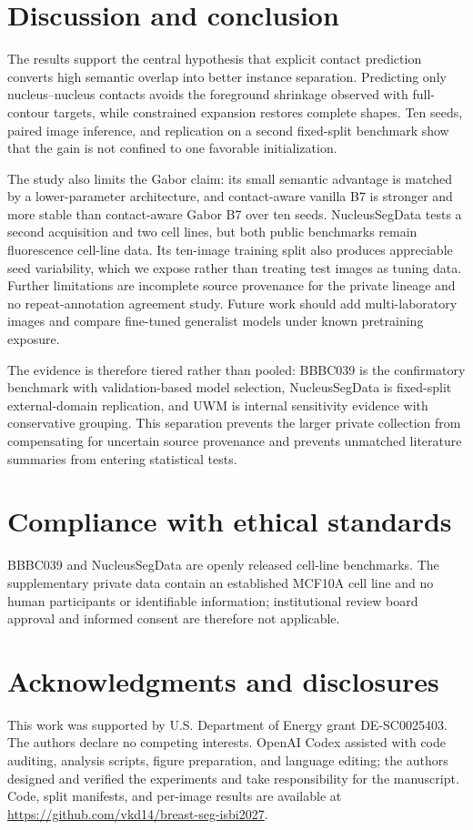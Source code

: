 \documentclass{article}
\begin{document}
\section{Discussion and conclusion}
The results support the central hypothesis that explicit contact prediction converts high semantic overlap into better instance separation. Predicting only nucleus--nucleus contacts avoids the foreground shrinkage observed with full-contour targets, while constrained expansion restores complete shapes. Ten seeds, paired image inference, and replication on a second fixed-split benchmark show that the gain is not confined to one favorable initialization.

The study also limits the Gabor claim: its small semantic advantage is matched by a lower-parameter architecture, and contact-aware vanilla B7 is stronger and more stable than contact-aware Gabor B7 over ten seeds. NucleusSegData tests a second acquisition and two cell lines, but both public benchmarks remain fluorescence cell-line data. Its ten-image training split also produces appreciable seed variability, which we expose rather than treating test images as tuning data. Further limitations are incomplete source provenance for the private lineage and no repeat-annotation agreement study. Future work should add multi-laboratory images and compare fine-tuned generalist models under known pretraining exposure.

The evidence is therefore tiered rather than pooled: BBBC039 is the confirmatory benchmark with validation-based model selection, NucleusSegData is fixed-split external-domain replication, and UWM is internal sensitivity evidence with conservative grouping. This separation prevents the larger private collection from compensating for uncertain source provenance and prevents unmatched literature summaries from entering statistical tests.

\section{Compliance with ethical standards}
BBBC039 and NucleusSegData are openly released cell-line benchmarks. The supplementary private data contain an established MCF10A cell line and no human participants or identifiable information; institutional review board approval and informed consent are therefore not applicable.

\section{Acknowledgments and disclosures}
This work was supported by U.S. Department of Energy grant DE-SC0025403. The authors declare no competing interests. OpenAI Codex assisted with code auditing, analysis scripts, figure preparation, and language editing; the authors designed and verified the experiments and take responsibility for the manuscript. Code, split manifests, and per-image results are available at \url{https://github.com/vkd14/breast-seg-isbi2027}.



\end{document}
